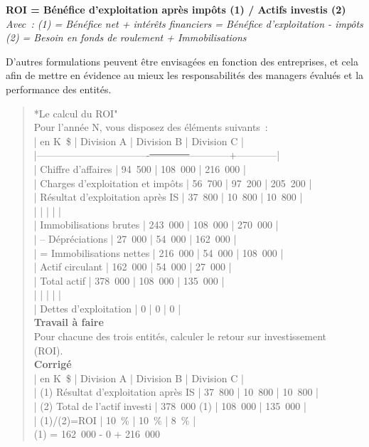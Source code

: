 \documentclass{tufte-handout}
\begin{document}
\begin{enumerate}
\begin{center}
\textbf{ROI = Bénéfice d'exploitation après impôts (1) / Actifs investis (2)}\\
\emph{Avec : (1) = Bénéfice net + intérêts financiers = Bénéfice d'exploitation - impôts (2) = Besoin en fonds de roulement + Immobilisations}\\
\end{center}
D'autres formulations peuvent être envisagées en fonction des entreprises, et cela afin de mettre en évidence au mieux les responsabilités des managers évalués et la performance des entités.\\
\begin{verse}
*Le calcul du ROI"\\
Pour l'année N, vous disposez des éléments suivants :\\
| en K \$                           | Division A | Division B | Division C |\\
|----------------------------------\sout{------------}------------+------------|\\
| Chiffre d'affaires               | 94 500     | 108 000    | 216 000    |\\
| Charges d'exploitation et impôts | 56 700     | 97 200     | 205 200    |\\
| Résultat d'exploitation après IS | 37 800     | 10 800     | 10 800     |\\
|                                  |            |            |            |\\
| Immobilisations brutes           | 243 000    | 108 000    | 270 000    |\\
| -- Dépréciations                 | 27 000     | 54 000     | 162 000    |\\
| = Immobilisations nettes         | 216 000    | 54 000     | 108 000    |\\
| Actif circulant                  | 162 000    | 54 000     | 27 000     |\\
| Total actif                      | 378 000    | 108 000    | 135 000    |\\
|                                  |            |            |            |\\
| Dettes d'exploitation            | 0          | 0          | 0          |\\
\textbf{Travail à faire}\\
Pour chacune des trois entités, calculer le retour sur investissement\\
(ROI).\\
\textbf{Corrigé}\\
| en K \$                               | Division A  | Division B | Division C |\\
| (1) Résultat d'exploitation après IS | 37 800      | 10 800     | 10 800     |\\
| (2) Total de l'actif investi         | 378 000 (1) | 108 000    | 135 000    |\\
| (1)/(2)=ROI                          | 10 \%        | 10 \%       | 8 \%        |\\
(1) = 162 000 - 0 + 216 000\\
\end{verse}


\end{enumerate}
\end{document}
